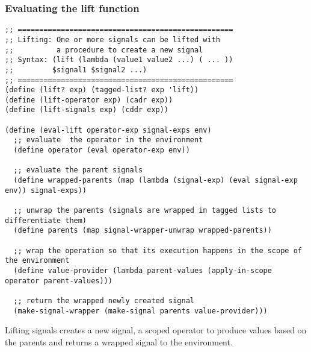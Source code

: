 \newpage
\subsubsection{Evaluating the lift function}
\begin{lstlisting}
;; ==================================================
;; Lifting: One or more signals can be lifted with
;;          a procedure to create a new signal
;; Syntax: (lift (lambda (value1 value2 ...) ( ... )) 
;;         $signal1 $signal2 ...)
;; ==================================================
(define (lift? exp) (tagged-list? exp 'lift))
(define (lift-operator exp) (cadr exp))
(define (lift-signals exp) (cddr exp))

(define (eval-lift operator-exp signal-exps env)
  ;; evaluate  the operator in the environment
  (define operator (eval operator-exp env))
  
  ;; evaluate the parent signals
  (define wrapped-parents (map (lambda (signal-exp) (eval signal-exp env)) signal-exps))
  
  ;; unwrap the parents (signals are wrapped in tagged lists to differentiate them)
  (define parents (map signal-wrapper-unwrap wrapped-parents)) 
  
  ;; wrap the operation so that its execution happens in the scope of the environment
  (define value-provider (lambda parent-values (apply-in-scope operator parent-values)))
  
  ;; return the wrapped newly created signal
  (make-signal-wrapper (make-signal parents value-provider)))
\end{lstlisting}

Lifting signals creates a new signal, a scoped operator to produce values based on the parents and returns a wrapped signal to the environment. 

\newpage
